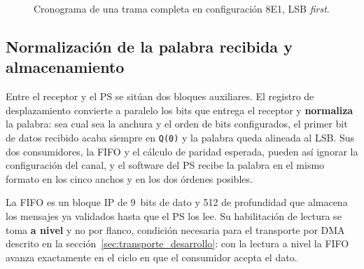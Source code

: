 \begin{figure}[htbp]
{}%
    \shorthandon{<>}
    \caption{Cronograma de una trama completa en configuración 8E1, LSB \textit{first}.}
    \label{fig:cronograma_trama}
\end{figure}

\subsection{Normalización de la palabra recibida y almacenamiento} \label{sec:normalizacion_fifo}

Entre el receptor y el PS se sitúan dos bloques auxiliares. El registro de desplazamiento
convierte a paralelo los bits que entrega el receptor y \textbf{normaliza} la palabra: sea cual
sea la anchura y el orden de bits configurados, el primer bit de datos recibido acaba siempre en
\texttt{Q(0)} y la palabra queda alineada al LSB. Sus dos consumidores, la FIFO y el cálculo de
paridad esperada, pueden así ignorar la configuración del canal, y el software del PS recibe la
palabra en el mismo formato en los cinco anchos y en los dos órdenes posibles.

La FIFO es un bloque IP de 9~bits de dato y 512 de profundidad que almacena los mensajes ya
validados hasta que el PS los lee. Su habilitación de lectura se toma \textbf{a nivel} y no por
flanco, condición necesaria para el transporte por DMA descrito en la
sección~\ref{sec:transporte_desarrollo}: con la lectura a nivel la FIFO avanza exactamente en el
ciclo en que el consumidor acepta el dato.

